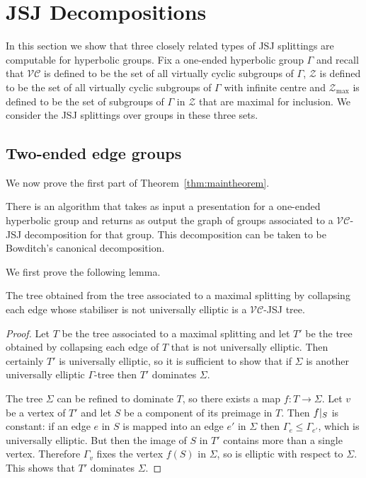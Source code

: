 \section{JSJ Decompositions}\label{sec:JSJcomputable}

In this section we show that three closely related types of JSJ splittings are
computable for hyperbolic groups. Fix a one-ended hyperbolic group $\Gamma$ and recall that 
$\mathcal{VC}$ is defined to be the set of all virtually cyclic subgroups of $\Gamma$,
$\mathcal{Z}$ is defined to be the set of all virtually cyclic subgroups of $\Gamma$
with infinite centre and $\mathcal{Z}_\text{max}$ is defined to be the set of
subgroups of $\Gamma$ in $\mathcal{Z}$ that are maximal for inclusion. We
consider the JSJ splittings over groups in these three sets.

\subsection{Two-ended edge groups}

We now prove the first part of Theorem~\ref{thm:maintheorem}.

\begin{thm}\label{thm:VC-JSJcomputable} There is an algorithm that takes as
input a presentation for a one-ended hyperbolic group and returns as output the graph
of groups associated to a $\mathcal{VC}$-JSJ decomposition for that group.
This decomposition can be taken to be Bowditch's canonical
decomposition.\end{thm}

We first prove the following lemma.

\begin{lem}\label{lem:JSJfrommaximal} The tree obtained from the tree
associated to a maximal splitting by collapsing each edge whose stabiliser is
not universally elliptic is a $\mathcal{VC}$-JSJ tree.\end{lem}

\begin{proof} Let $T$ be the tree associated to a maximal splitting and let
$T'$ be the tree obtained by collapsing each edge of $T$ that is not
universally elliptic. Then certainly $T'$ is universally elliptic, so it is
sufficient to show that if $\Sigma$ is another universally elliptic
$\Gamma$-tree then $T'$ dominates $\Sigma$.

The tree $\Sigma$ can be refined to dominate $T$, so there exists a map $f
\colon T \to \Sigma$.  Let $v$ be a vertex of $T'$ and let $S$ be a
component of its preimage in $T$.  Then $f\vert_{S}$ is constant: if
an edge $e$ in $S$ is mapped into an edge $e'$ in $\Sigma$ then $\Gamma_e \leq
\Gamma_{e'}$, which is universally elliptic.  But then the image of $S$ in
$T'$ contains more than a single vertex.  Therefore $\Gamma_v$ fixes the
vertex $f(S)$ in $\Sigma$, so is elliptic with respect to $\Sigma$. This shows that
$T'$ dominates $\Sigma$.\end{proof}

